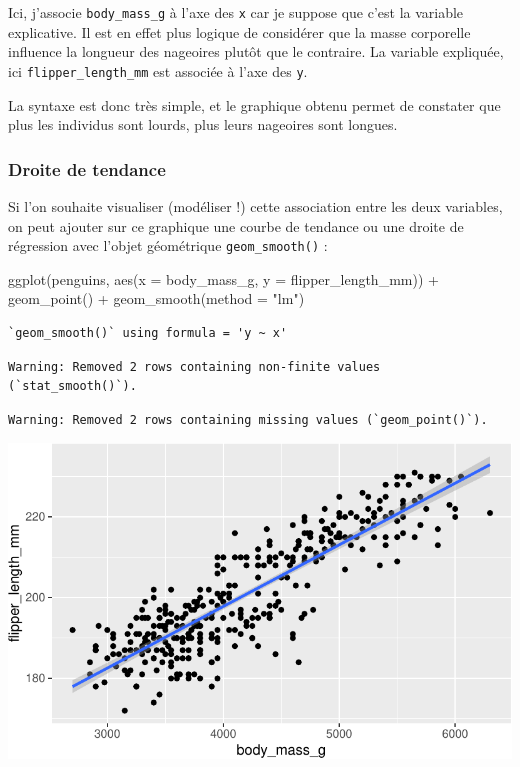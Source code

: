 \documentclass[
  a4paper,
  DIV=11,
  numbers=noendperiod,
  oneside]{scrreprt}
\newenvironment{Shaded}{}{}
\newcommand{\AttributeTok}[1]{\textcolor[rgb]{0.84,0.23,0.29}{#1}}
\newcommand{\FunctionTok}[1]{\textcolor[rgb]{0.44,0.26,0.76}{#1}}
\newcommand{\NormalTok}[1]{\textcolor[rgb]{0.14,0.16,0.18}{#1}}
\newcommand{\SpecialCharTok}[1]{\textcolor[rgb]{0.00,0.36,0.77}{#1}}
\newcommand{\StringTok}[1]{\textcolor[rgb]{0.01,0.18,0.38}{#1}}
\begin{document}
Ici, j'associe \texttt{body\_mass\_g} à l'axe des \texttt{x} car je
suppose que c'est la variable explicative. Il est en effet plus logique
de considérer que la masse corporelle influence la longueur des
nageoires plutôt que le contraire. La variable expliquée, ici
\texttt{flipper\_length\_mm} est associée à l'axe des \texttt{y}.

La syntaxe est donc très simple, et le graphique obtenu permet de
constater que plus les individus sont lourds, plus leurs nageoires sont
longues.

\subsubsection{Droite de tendance}\label{droite-de-tendance}

Si l'on souhaite visualiser (modéliser !) cette association entre les
deux variables, on peut ajouter sur ce graphique une courbe de tendance
ou une droite de régression avec l'objet géométrique
\texttt{geom\_smooth()} :

\begin{Shaded}
\begin{Highlighting}[]
\FunctionTok{ggplot}\NormalTok{(penguins, }\FunctionTok{aes}\NormalTok{(}\AttributeTok{x =}\NormalTok{ body\_mass\_g, }\AttributeTok{y =}\NormalTok{ flipper\_length\_mm)) }\SpecialCharTok{+}
  \FunctionTok{geom\_point}\NormalTok{() }\SpecialCharTok{+}
  \FunctionTok{geom\_smooth}\NormalTok{(}\AttributeTok{method =} \StringTok{"lm"}\NormalTok{)}
\end{Highlighting}
\end{Shaded}

\begin{verbatim}
`geom_smooth()` using formula = 'y ~ x'
\end{verbatim}

\begin{verbatim}
Warning: Removed 2 rows containing non-finite values (`stat_smooth()`).
\end{verbatim}

\begin{verbatim}
Warning: Removed 2 rows containing missing values (`geom_point()`).
\end{verbatim}

\includegraphics{03-visualization_files/figure-pdf/unnamed-chunk-48-1.pdf}
\end{document}
